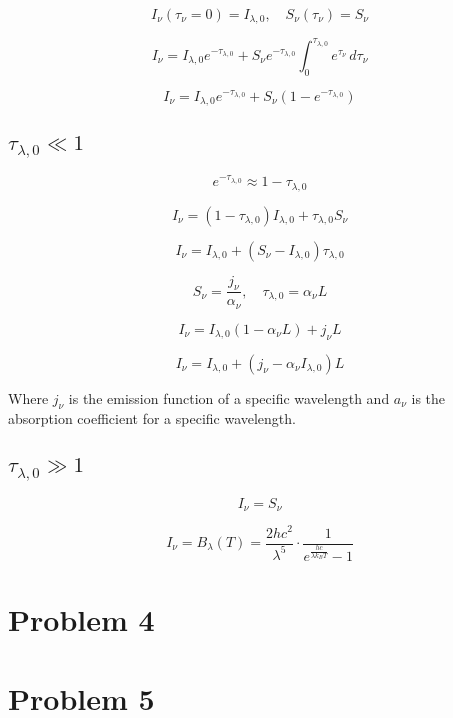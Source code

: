 \documentclass[12pt]{article}
\begin{document}
\[
    I_\nu(\tau_\nu=0) = I_{\lambda,0},\quad S_\nu(\tau_\nu) = S_\nu
\]

\[
    I_\nu = I_{\lambda,0} e^{-\tau_{\lambda,0}} + S_\nu e^{-\tau_{\lambda,0}} \int_{0}^{\tau_{\lambda,0}} e^{\tau_\nu} \, d\tau_\nu
\]

\[
    I_\nu = I_{\lambda,0} e^{-\tau_{\lambda,0}} + S_\nu (1 - e^{-\tau_{\lambda,0}})
\]


\subsection{$\tau_{\lambda,0} \ll 1$}

\[
    e^{-\tau_{\lambda,0}} \approx 1 - \tau_{\lambda,0}
\]

\[
    I_\nu = (1 - \tau_{\lambda,0})I_{\lambda,0} + \tau_{\lambda,0}S_\nu
\]

\[
    I_\nu = I_{\lambda,0} + (S_\nu - I_{\lambda,0})\tau_{\lambda,0}
\]

\[
    S_\nu = \frac{j_\nu}{\alpha_\nu},\quad \tau_{\lambda,0} = \alpha_\nu L
\]

\[
    I_\nu = I_{\lambda,0} (1 - \alpha_\nu L) + j_\nu L
\]

\[
    I_\nu = I_{\lambda,0} + (j_\nu - \alpha_\nu I_{\lambda,0})L
\]

Where $j_\nu$ is the emission function of a specific wavelength and $a_\nu$ is the absorption coefficient for a specific wavelength.

\subsection{$\tau_{\lambda,0} \gg 1$}

\[
    I_\nu = S_\nu
\]

\[
    I_\nu = B_\lambda(T) = \frac{2 h c^2}{\lambda^5} \cdot \frac{1}{e^{\frac{h c}{\lambda k_B T}} - 1}
\]

\newpage

\section{Problem 4}



\newpage

\section{Problem 5}



\newpage



\nocite{El-Deeb_PEU-438_Assignments}
\end{document}
